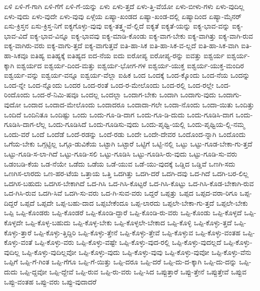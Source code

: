 {ಏಳಿ
ಏಳಿ-ಗೆ-ಗಾಗಿ
ಏಳಿ-ಗೆಗೆ
ಏಳಿ-ಗೆ-ಯನ್ನು
ಏಳು
ಏಳು-ತ್ತದೆ
ಏಳು-ತ್ತಿ-ವೆಯೋ
ಏಳು-ಬೀಳು-ಗಳು
ಏಳು-ವುದಿಲ್ಲ
ಏಳು-ವುದು
ಏಳು-ವುದೇ
ಏಳು-ವುವು
ಏಳ್ಗೆಯ
ಏಷ್ಯಾ-ಖಂಡದ
ಏಷ್ಯಾ-ಖಂಡ-ದಲ್ಲಿ
ಏಷ್ಯಾದಿಂದ
ಏಷ್ಯಾ-ಮೈನರ್
ಏಸು-ಕ್ರಿಸ್ತನ
ಏಸು-ಕ್ರಿಸ್ತ-ನಿಗೆ
ಐಕ್ಯಗೊಳ್ಳು-ವುವು
ಐಕ್ಯ-ತತ್ತ್ವ-ವೆ-ಲ್ಲಿದೆ
ಐಕ್ಯತೆ
ಐಕ್ಯತೆ-ಯನ್ನು
ಐಕ್ಯ-ಭಾವ-ವನ್ನು
ಐಕ್ಯ-ಭಾವ-ವಿದೆ
ಐಕ್ಯ-ಭಾವ-ವಿನ್ನೂ
ಐಕ್ಯ-ಭಾವವು
ಐಕ್ಯ-ಮಾಡಿ-ಕೊಂಡು
ಐಕ್ಯ-ವಾಗ-ಬೇಕು
ಐಕ್ಯ-ವಾಗಿತ್ತು
ಐಕ್ಯ-ವಾಗಿ-ರುವ
ಐಕ್ಯ-ವಾಗಿರು-ವರು
ಐಕ್ಯ-ವಾಗು-ತ್ತದೆ
ಐಕ್ಯ-ವಾಗುತ್ತವೆ
ಐತಿ-ಹಾ-ಸಿಕ
ಐತಿ-ಹಾ-ಸಿಕ-ವ-ಲ್ಲದೆ
ಐತಿ-ಹಾ-ಸಿಕ-ವಾಗಿ
ಐತಿ-ಹಾ-ಸಿಕವೂ
ಐತಿಹ್ಯ
ಐತಿಹ್ಯಕ್ಕೆ
ಐತಿಹ್ಯದ
ಐದ-ನೆಯ
ಐದು
ಐರೋಪ್ಯ
ಐರೋಪ್ಯ-ರನ್ನು
ಐವತ್ತು
ಐಶ್ವರ್ಯ
ಐಶ್ವರ್ಯ-ಕ್ಕಾಗಿ
ಐಶ್ವರ್ಯದ
ಐಶ್ವರ್ಯ-ದಿಂದ-ಮತ್ತು
ಐಶ್ವರ್ಯ-ಭೋಗ-ಗಳ
ಐಶ್ವರ್ಯ-ಯುಕ್ತ
ಐಶ್ವರ್ಯ-ಯುಕ್ತ-ಮಂದಿರ
ಐಶ್ವರ್ಯ-ವನ್ನು
ಐಶ್ವರ್ಯ-ವನ್ನೂ
ಐಶ್ವರ್ಯ-ವೆಲ್ಲಾ
ಐಹಿಕ
ಒಂದ
ಒಂದಕ್ಕೆ
ಒಂದ-ಕ್ಕೊಂದು
ಒಂದ-ನೆಯ
ಒಂದನ್ನು
ಒಂದ-ನ್ನೇ
ಒಂದ-ನ್ನೊಂದು
ಒಂದರ
ಒಂದ-ರಂತೆ
ಒಂದ-ರ-ಮೇಲೊಂದು
ಒಂದ-ರಲ್ಲಿ
ಒಂದ-ರಲ್ಲೇ
ಒಂದ-ರಿಂದೊಂದು
ಒಂದ-ರೆ-ನಿಮಿ-ಷವೂ
ಒಂದಲ್ಲ
ಒಂದಲ್ಲಾ
ಒಂದಾಗ-ಬೇಕು
ಒಂದಾಗಿ
ಒಂದಾಗು-ವುದು
ಒಂದಾಗು-ವುದೋ
ಒಂದಾದ
ಒಂದಾದ-ಮೇಲೊಂದು
ಒಂದಾದರೂ
ಒಂದಾದಾ-ಗಲೇ
ಒಂದಾ-ನೊಂದು
ಒಂದಾ-ಯಿತು
ಒಂದಿತ್ತು
ಒಂದಿದೆ
ಒಂದಿನಿತೂ
ಒಂದಿಷ್ಟು
ಒಂದು
ಒಂದು-ಗೂ-ಡಿ-ದಾಗ
ಒಂದು-ಗೂ-ಡಿ-ದುದು
ಒಂದು-ಗೂಡಿಸಿ-ದಾಗ
ಒಂದು-ಗೂಡಿಸಿ-ದಾಗ-ಲೆಲ್ಲ
ಒಂದು-ಗೂಡಿಸಿದೆ
ಒಂದು-ಗೂಡಿಸು-ವುದು
ಒಂದು-ಪೃಥ್ವಿ-ಯಲ್ಲಿ
ಒಂದು-ಪೃಥ್ವಿಯ-ಲ್ಲಿ-ನಮ್ಮ
ಒಂದು-ವರೆ
ಒಂದೆ
ಒಂದೆಡೆ
ಒಂದೆ-ರಡನ್ನು
ಒಂದೆ-ರಡು
ಒಂದೇ
ಒಂದೇ-ದೇವರ
ಒಂದೊಂದ-ನ್ನಾಗಿ
ಒಂದೊಂದು
ಒಗೆಯ-ಬೇಕು
ಒಗ್ಗಟ್ಟಿಲ್ಲ
ಒಗ್ಗೂ-ಡುವಿಕೆಯ
ಒಟ್ಟಾಗಿ
ಒಟ್ಟಾರೆ
ಒಟ್ಟಿಗೆ
ಒಟ್ಟಿ-ನಲ್ಲಿ
ಒಟ್ಟು
ಒಟ್ಟು-ಗೂಡ-ಬೇಕಾ-ಗು-ತ್ತದೆ
ಒಟ್ಟು-ಗೂಡಿ-ಸ-ಲಾ-ಗಿದೆ
ಒಟ್ಟು-ಗೂಡಿ-ಸಲಿ
ಒಟ್ಟು-ಗೂಡಿಸಿ
ಒಟ್ಟು-ಗೂಡಿಸಿ-ರು-ವುದು
ಒಟ್ಟು-ಗೂಡಿ-ಸು-ವರು
ಒಡಂಬಡಿ-ಕೆಯ
ಒಡ-ನೆಯೇ
ಒಡೆದು
ಒಡೆಯ
ಒಡೆ-ಯುವ
ಒಡೆ-ಯು-ವುದಕ್ಕೆ
ಒಡ್ಡಿದ
ಒಡ್ಡಿವೆ
ಒಣಗಿ-ಸದು
ಒಣಗಿಸ-ಲಾರದು
ಒಣ-ಹರ-ಟೆಯ
ಒತ್ತಾಯ
ಒತ್ತಿ
ಒದಗಿತ್ತು
ಒದಗಿ-ದರೆ
ಒದಗಿ-ದವು
ಒದ-ಗಿದೆ
ಒದಗಿ-ಬರ-ಲಿಲ್ಲ
ಒದಗಿಸ-ಬಹುದು
ಒದಗಿಸ-ಬೇಕಾಗಿದೆ
ಒದ-ಗಿಸಿ
ಒದ-ಗಿಸಿ-ಕೊಟ್ಟರೆ
ಒದ-ಗಿಸಿ-ಕೊಟ್ಟು
ಒದ-ಗಿಸಿ-ಕೊಡ-ಬೇಕಾಗಿ-ರುವ
ಒದ-ಗಿಸಿ-ರುವ
ಒದಗಿ-ಸಿವೆ
ಒದಗಿ-ಸು-ವರು
ಒದ-ಗಿ-ಸುವ-ವರು
ಒದ್ದರೆ
ಒಪ್ಪತ್ತು
ಒಪ್ಪದ
ಒಪ್ಪದ-ವರಾ-ರಿಗೂ
ಒಪ್ಪ-ದಿದ್ದರೆ
ಒಪ್ಪದೆ
ಒಪ್ಪದೇ
ಒಪ್ಪ-ಬಹು-ದಾದ
ಒಪ್ಪಬೇಕೆಂದೂ
ಒಪ್ಪ-ಲಾರದು
ಒಪ್ಪಲೇ-ಬೇಕಾ-ಗು-ತ್ತದೆ
ಒಪ್ಪಲೇ-ಬೇಕು
ಒಪ್ಪಿ
ಒಪ್ಪಿ-ಕೊಂಡರು
ಒಪ್ಪಿ-ಕೊಂಡರೆ
ಒಪ್ಪಿ-ಕೊಂಡಿ-ದ್ದಾರೆ
ಒಪ್ಪಿ-ಕೊಂಡಿ-ರು-ವರು
ಒಪ್ಪಿ-ಕೊಂಡು
ಒಪ್ಪಿ-ಕೊಳ್ಳದೆ
ಒಪ್ಪಿ-ಕೊಳ್ಳದೇ
ಒಪ್ಪಿ-ಕೊಳ್ಳ-ಬಹುದು
ಒಪ್ಪಿ-ಕೊಳ್ಳ-ಬೇಕು
ಒಪ್ಪಿ-ಕೊಳ್ಳಲೇ-ಬೇಕಾದ
ಒಪ್ಪಿ-ಕೊಳ್ಳಿ
ಒಪ್ಪಿ-ಕೊಳ್ಳು-ತ್ತದೆ
ಒಪ್ಪಿ-ಕೊಳ್ಳು-ತ್ತಾರೆ
ಒಪ್ಪಿ-ಕೊಳ್ಳು-ತ್ತಿದ್ದಿರಿ
ಒಪ್ಪಿ-ಕೊಳ್ಳು-ತ್ತೇನೆ
ಒಪ್ಪಿ-ಕೊಳ್ಳು-ತ್ತೇವೆ
ಒಪ್ಪಿ-ಕೊಳ್ಳುವ
ಒಪ್ಪಿ-ಕೊಳ್ಳು-ವಂತಹ
ಒಪ್ಪಿ-ಕೊಳ್ಳು-ವಂತೆ
ಒಪ್ಪಿ-ಕೊಳ್ಳು-ವರು
ಒಪ್ಪಿ-ಕೊಳ್ಳು-ವಷ್ಟೇ
ಒಪ್ಪಿ-ಕೊಳ್ಳು-ವುದ-ರಲ್ಲಿ
ಒಪ್ಪಿ-ಕೊಳ್ಳು-ವುದಲ್ಲದೆ
ಒಪ್ಪಿ-ಕೊಳ್ಳು-ವುದಿಲ್ಲ
ಒಪ್ಪಿ-ಕೊಳ್ಳು-ವುದಿಲ್ಲವೋ
ಒಪ್ಪಿ-ಕೊಳ್ಳು-ವುದು
ಒಪ್ಪಿ-ಕೊಳ್ಳು-ವುವು
ಒಪ್ಪಿ-ಕೊಳ್ಳು-ವುವೋ
ಒಪ್ಪಿ-ಕೊಳ್ಳು-ವೆನು
ಒಪ್ಪಿಗೆ
ಒಪ್ಪಿ-ಗೆ-ಗಿಂತ
ಒಪ್ಪಿ-ಗೆಗೂ
ಒಪ್ಪಿ-ಗೆ-ಯಿತ್ತು
ಒಪ್ಪಿ-ದರೂ
ಒಪ್ಪಿ-ದರೆ
ಒಪ್ಪಿ-ದು-ದ-ಕ್ಕಾಗಿ
ಒಪ್ಪಿ-ದು-ದನ್ನು
ಒಪ್ಪಿ-ದುದು
ಒಪ್ಪಿ-ದ್ದವೋ
ಒಪ್ಪಿ-ದ್ದೇವೆ
ಒಪ್ಪಿ-ರುವ
ಒಪ್ಪಿ-ರು-ವರು
ಒಪ್ಪಿ-ಸಿದ
ಒಪ್ಪುತ್ತಾರೆ
ಒಪ್ಪು-ತ್ತೇನೆ
ಒಪ್ಪುತ್ತೇವೆ
ಒಪ್ಪುವ
ಒಪ್ಪು-ವಂತಹ
ಒಪ್ಪು-ವರು
ಒಪ್ಪು-ವುದಾದರೆ
}
